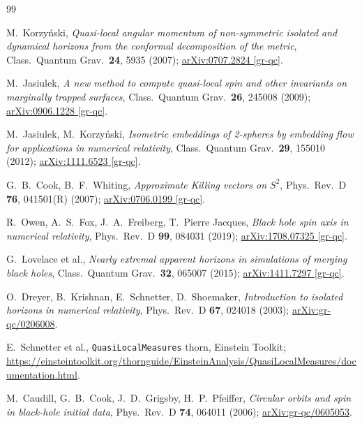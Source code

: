\documentclass[11pt]{article}
\begin{document}
\begin{thebibliography}{99}

M.~Korzy\'nski,
\emph{Quasi-local angular momentum of non-symmetric isolated and dynamical
horizons from the conformal decomposition of the metric},
Class.\ Quantum Grav.\ \textbf{24}, 5935 (2007);
\href{https://arxiv.org/abs/0707.2824}{arXiv:0707.2824 [gr-qc]}.

M.~Jasiulek,
\emph{A new method to compute quasi-local spin and other invariants on
marginally trapped surfaces},
Class.\ Quantum Grav.\ \textbf{26}, 245008 (2009);
\href{https://arxiv.org/abs/0906.1228}{arXiv:0906.1228 [gr-qc]}.

M.~Jasiulek, M.~Korzy\'nski,
\emph{Isometric embeddings of 2-spheres by embedding flow for applications
in numerical relativity},
Class.\ Quantum Grav.\ \textbf{29}, 155010 (2012);
\href{https://arxiv.org/abs/1111.6523}{arXiv:1111.6523 [gr-qc]}.

G.~B.~Cook, B.~F.~Whiting,
\emph{Approximate Killing vectors on $S^2$},
Phys.\ Rev.\ D \textbf{76}, 041501(R) (2007);
\href{https://arxiv.org/abs/0706.0199}{arXiv:0706.0199 [gr-qc]}.

R.~Owen, A.~S.~Fox, J.~A.~Freiberg, T.~Pierre Jacques,
\emph{Black hole spin axis in numerical relativity},
Phys.\ Rev.\ D \textbf{99}, 084031 (2019);
\href{https://arxiv.org/abs/1708.07325}{arXiv:1708.07325 [gr-qc]}.

G.~Lovelace et al.,
\emph{Nearly extremal apparent horizons in simulations of merging black
holes},
Class.\ Quantum Grav.\ \textbf{32}, 065007 (2015);
\href{https://arxiv.org/abs/1411.7297}{arXiv:1411.7297 [gr-qc]}.

O.~Dreyer, B.~Krishnan, E.~Schnetter, D.~Shoemaker,
\emph{Introduction to isolated horizons in numerical relativity},
Phys.\ Rev.\ D \textbf{67}, 024018 (2003);
\href{https://arxiv.org/abs/gr-qc/0206008}{arXiv:gr-qc/0206008}.

E.~Schnetter et al.,
\texttt{QuasiLocalMeasures} thorn, Einstein Toolkit;
\url{https://einsteintoolkit.org/thornguide/EinsteinAnalysis/QuasiLocalMeasures/documentation.html}.

M.~Caudill, G.~B.~Cook, J.~D.~Grigsby, H.~P.~Pfeiffer,
\emph{Circular orbits and spin in black-hole initial data},
Phys.\ Rev.\ D \textbf{74}, 064011 (2006);
\href{https://arxiv.org/abs/gr-qc/0605053}{arXiv:gr-qc/0605053}.


\end{thebibliography}
\end{document}
